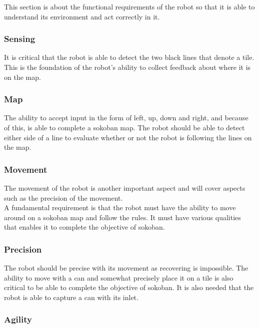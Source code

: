 \documentclass[../../main.tex]{subfiles}
\begin{document}
This section is about the functional requirements of the robot so that it is able to understand its environment and act correctly in it.

\subsubsection{Sensing}%
\label{sub:sensing}

It is critical that the robot is able to detect the two black lines that denote a tile. This is the foundation of the robot's ability to collect feedback about where it is on the map.

\subsubsection{Map}%
\label{ssub:map}

The ability to accept input in the form of left, up, down and right, and because of this, is able to complete a sokoban map.
The robot should be able to detect either side of a line to evaluate whether or not the robot is following the lines on the map.

\subsubsection{Movement}%
\label{sub:movement}

The movement of the robot is another important aspect and will cover aspects such as the precision of the movement.\\
A fundamental requirement is that the robot must have the ability to move around on a sokoban map and follow the rules. It must have various qualities that enables it to complete the objective of sokoban.

\subsubsection{Precision}%
\label{ssub:precision}

The robot should be precise with its movement as recovering is impossible.
The ability to move with a can and somewhat precisely place it on a tile is also critical to be able to complete the objective of sokoban. It is also needed that the robot is able to capture a can with its inlet.

\subsubsection{Agility}%
\label{ssub:agility}
\end{document}

